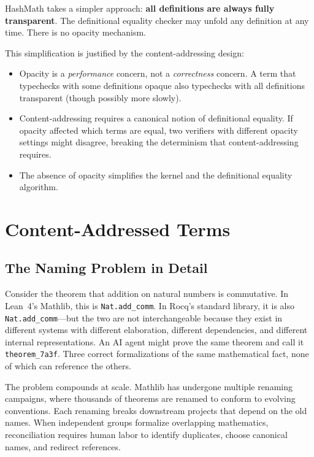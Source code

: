 \documentclass[11pt]{article}
\theoremstyle{definition}
\theoremstyle{plain}
\theoremstyle{remark}
\begin{document}
HashMath takes a simpler approach: \textbf{all definitions are always fully transparent}.
The definitional equality checker may unfold any definition at any time.
There is no opacity mechanism.

This simplification is justified by the content-addressing design:
\begin{itemize}[nosep]
  \item Opacity is a \emph{performance} concern, not a \emph{correctness} concern.
        A term that typechecks with some definitions opaque also typechecks with all definitions transparent (though possibly more slowly).
  \item Content-addressing requires a canonical notion of definitional equality.
        If opacity affected which terms are equal, two verifiers with different opacity settings might disagree, breaking the determinism that content-addressing requires.
  \item The absence of opacity simplifies the kernel and the definitional equality algorithm.
\end{itemize}


\section{Content-Addressed Terms}
\label{sec:content}

\subsection{The Naming Problem in Detail}
\label{sec:naming-problem}

Consider the theorem that addition on natural numbers is commutative.
In Lean~4's Mathlib, this is \texttt{Nat.add\_comm}.
In Rocq's standard library, it is also \texttt{Nat.add\_comm}---but the two are not interchangeable
because they exist in different systems with different elaboration, different dependencies, and
different internal representations.
An AI agent might prove the same theorem and call it \texttt{theorem\_7a3f}.
Three correct formalizations of the same mathematical fact, none of which can reference the others.

The problem compounds at scale.
Mathlib has undergone multiple renaming campaigns, where thousands of theorems are renamed
to conform to evolving conventions.
Each renaming breaks downstream projects that depend on the old names.
When independent groups formalize overlapping mathematics, reconciliation requires human labor
to identify duplicates, choose canonical names, and redirect references.
\end{document}
